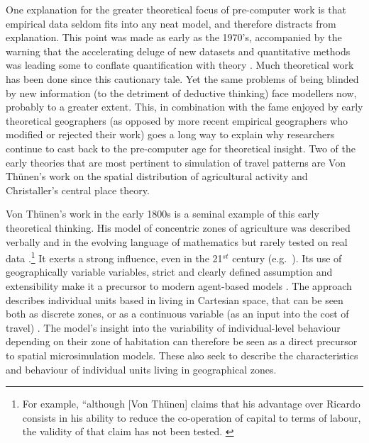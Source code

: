One explanation for the greater theoretical focus of pre-computer work
is that empirical data seldom fits into any neat model, and therefore
distracts from explanation.
This point was made as early as the 1970's, accompanied by the
warning that the
accelerating deluge of new datasets and quantitative methods was leading some
to conflate quantification with theory \citep{Wilson1972-theoretical}.
Much theoretical work has been done since this cautionary tale. Yet the
same problems of being blinded by new information (to the detriment of
deductive thinking) face modellers now, probably to a greater extent.
This, in combination with the fame enjoyed by early theoretical geographers
(as opposed by more recent empirical geographers who modified or
rejected their work) goes a long way to explain why
researchers continue to cast back to
the pre-computer age for theoretical
insight. Two of the early theories that are most pertinent to
simulation of travel patterns are Von Th\"{u}nen's work on the
spatial distribution of
agricultural activity and Christaller's central place theory.

Von Th\"{u}nen's work in the early 1800s is a seminal example of this early
theoretical thinking. His model of concentric zones of agriculture was
described verbally and in the evolving language of mathematics but rarely tested
on real data \citep{moore1895thunen}.\footnote{For example, ``although [Von
Th\"{u}nen] claims that his advantage over Ricardo consists in his ability to
reduce the co-operation of capital to terms of labour, the validity of that
claim has not been tested. \citep[p.~126]{Moore1895-thesis}} It exerts a strong
influence, even in the 21$^{st}$ century (e.g.~\citealp{lankoski2008bioenergy}).
Its use of geographically variable variables, strict and clearly
defined assumption and extensibility make it a precursor to modern agent-based
models \citep{sasaki2003agent}. The approach describes individual units based in
living in Cartesian space, that can be seen both as discrete zones, or as
a continuous variable (as an input into the cost of travel)
\citep{Stevens1968a}. The model's insight into the variability of
individual-level behaviour depending on their zone of habitation can therefore
be seen as a direct precursor to spatial microsimulation models. These also
seek to describe the characteristics and behaviour of individual units living in
geographical zones.

